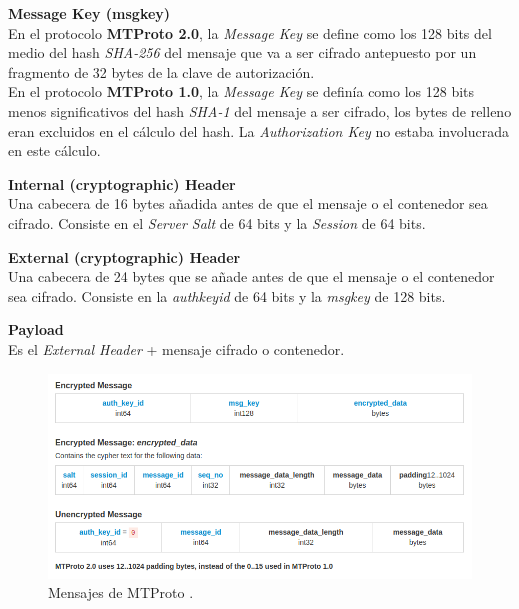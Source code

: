 \begin{description}
	\item \textbf{Message Key (msg\textunderscore key)}\\
	En el protocolo \textbf{MTProto 2.0}, la \emph{Message Key} se define como los 128 bits del medio del hash \emph{SHA-256} del mensaje que va a ser cifrado antepuesto por un fragmento de 32 bytes de la clave de autorización.\\
	En el protocolo \textbf{MTProto 1.0}, la \emph{Message Key} se definía como los 128 bits menos significativos del hash \emph{SHA-1} del mensaje a ser cifrado, los bytes de relleno eran excluidos en el cálculo del hash. La \emph{Authorization Key} no estaba involucrada en este cálculo.

	\item \textbf{Internal (cryptographic) Header}\\
	Una cabecera de 16 bytes añadida antes de que el mensaje o el contenedor sea cifrado. Consiste en el \emph{Server Salt} de 64 bits y la \emph{Session} de 64 bits.

	\item \textbf{External (cryptographic) Header}\\
	Una cabecera de 24 bytes que se añade antes de que el mensaje o el contenedor sea cifrado. Consiste en la \emph{auth\textunderscore key\textunderscore id} de 64 bits y la \emph{msg\textunderscore key} de 128 bits.

	\item \textbf{Payload}\\
	Es el \emph{External Header} + mensaje cifrado o contenedor.
\end{description}

\begin{figure}[htb]
	\centering
	\includegraphics[scale=0.45]{imagenes/MTProto2.png} 
	\caption{Mensajes de MTProto \cite{WebProto}.}
	\label{mtproto1}
\end{figure}

